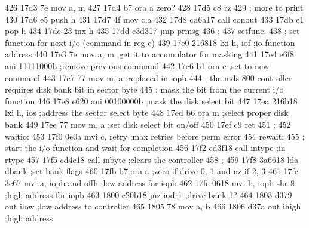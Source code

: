 426      17d3 7e                   mov      a, m
427      17d4 b7                   ora      a          zero?
428      17d5 c8                   rz
429                       ;        more to print
430      17d6 e5                   push     h
431      17d7 4f                   mov      c,a
432      17d8 cd6a17               call     conout
433      17db e1                   pop      h
434      17dc 23                   inx      h
435      17dd c3d317               jmp      prmsg
436                       ;
437                       setfunc:
438                       ;        set function for next i/o (command in reg-c)
439      17e0 216818               lxi      h, iof     ;io function address
440      17e3 7e                   mov      a, m       ;get it to accumulator for masking
441      17e4 e6f8                 ani      11111000b  ;remove previous command
442      17e6 b1                   ora      c          ;set to new command
443      17e7 77                   mov      m, a       ;replaced in iopb
444                       ;        the mds-800 controller requires disk bank bit in sector byte
445                       ;        mask the bit from the current i/o function
446      17e8 e620                 ani      00100000b        ;mask the disk select bit
447      17ea 216b18               lxi      h, ios           ;address the sector select byte
448      17ed b6                   ora      m                ;select proper disk bank
449      17ee 77                   mov      m, a             ;set disk select bit on/off
450      17ef c9                   ret
451                       ;
452                       waitio:
453      17f0 0e0a                 mvi      c, retry   ;max retries before perm error
454                       rewait:
455                       ;        start the i/o function and wait for completion
456      17f2 cd3f18               call     intype     ;in rtype
457      17f5 cd4c18               call     inbyte     ;clears the controller
458                       ;
459      17f8 3a6618               lda      dbank            ;set bank flags
460      17fb b7                   ora      a                ;zero if drive 0, 1 and nz if 2, 3
461      17fc 3e67                 mvi      a, iopb and offh ;low address for iopb
462      17fe 0618                 mvi      b, iopb shr 8    ;high address for iopb
463      1800 c20b18               jnz      iodr1      ;drive bank 1?
464      1803 d379                 out      ilow             ;low address to controller
465      1805 78                   mov      a, b
466      1806 d37a                 out      ihigh      ;high address
